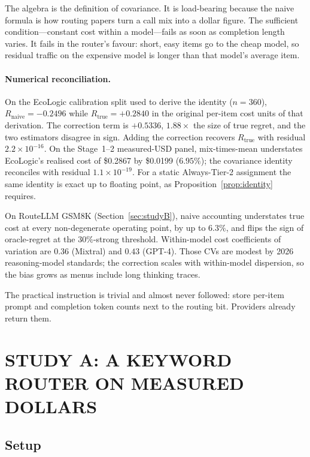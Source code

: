 \documentclass[a4paper,twoside]{article}
\begin{document}
The algebra is the definition of covariance. It is load-bearing because the naive formula is how routing papers turn a call mix into a dollar figure. The sufficient condition---constant cost within a model---fails as soon as completion length varies. It fails in the router's favour: short, easy items go to the cheap model, so residual traffic on the expensive model is longer than that model's average item.

\paragraph{Numerical reconciliation.}
On the EcoLogic calibration split used to derive the identity ($n=360$), $R_{\mathrm{naive}}=-0.2496$ while $R_{\mathrm{true}}=+0.2840$ in the original per-item cost units of that derivation. The correction term is $+0.5336$, $1.88\times$ the size of true regret, and the two estimators disagree in sign. Adding the correction recovers $R_{\mathrm{true}}$ with residual $2.2\times 10^{-16}$. On the Stage~1--2 measured-USD panel, mix-times-mean understates EcoLogic's realised cost of \$0.2867 by \$0.0199 ($6.95\%$); the covariance identity reconciles with residual $1.1\times 10^{-19}$. For a static Always-Tier-2 assignment the same identity is exact up to floating point, as Proposition~\ref{prop:identity} requires.

On RouteLLM GSM8K (Section~\ref{sec:studyB}), naive accounting understates true cost at every non-degenerate operating point, by up to $6.3\%$, and flips the sign of oracle-regret at the $30\%$-strong threshold. Within-model cost coefficients of variation are $0.36$ (Mixtral) and $0.43$ (GPT-4). Those CVs are modest by 2026 reasoning-model standards; the correction scales with within-model dispersion, so the bias grows as menus include long thinking traces.

The practical instruction is trivial and almost never followed: store per-item prompt and completion token counts next to the routing bit. Providers already return them.

\section{\uppercase{Study A: A Keyword Router on Measured Dollars}}
\label{sec:studyA}

\subsection{Setup}
\end{document}
